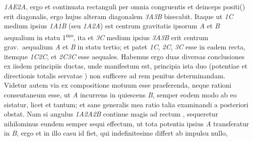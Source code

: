  \textit{{\scriptsize1}AE{\scriptsize2}A}, ergo et continuata rectanguli  
%
%
 per omnia congruentis et deinceps positi\protect\vphantom() erit diagonalis, ergo hujus alteram diagonalem%
\protect{}
%
 \textit{{\scriptsize3}A{\scriptsize3}B} bisecabit. Itaque ut \textit{{\scriptsize1}C} medium ipsius \textit{{\scriptsize1}A{\scriptsize1}B} (seu \textit{{\scriptsize1}A{\scriptsize2}A})
%
 est %
centrum gravitatis\protect{} ipsorum \textit{A} et \textit{B} aequalium in statu 1\textsuperscript{mo},%
\protect{} ita et \textit{{\scriptsize3}C} medium ipsius \textit{{\scriptsize3}A{\scriptsize3}B} erit centrum%
\protect{} grav.\ aequalium \textit{A} et \textit{B} in statu tertio;%
\protect{} et patet \textit{{\scriptsize1}C}, \textit{{\scriptsize2}C}, \textit{{\scriptsize3}C} esse in eadem recta, itemque \textit{{\scriptsize1}C{\scriptsize2}C}, et \textit{{\scriptsize2}C{\scriptsize3}C} esse aequales. 
\pend
\pstart
 Habemus ergo duas diversas conclusiones ex iisdem principiis ductas, unde manifestum est, principia ista duo (potentiae%
\protect{} et directionis totalis servatae%
\protect{}) non sufficere ad rem penitus determinandam. 
\pend
\pstart
 Videtur autem via ex compositione motuum\protect{} esse praeferenda, neque rationi%
\protect{} consentaneum esse, ut \textit{A} incurrens in quiescens \textit{B}, semper eodem modo ab eo sistatur, licet  
%
 et tantum; et sane generalis mea ratio talia examinandi a posteriori obstat. Nam si angulus \textit{{\scriptsize1}A{\scriptsize2}A{\scriptsize2}B} continue magis ad rectum  
%
, sequeretur nihilominus eundem semper sequi effectum,%
\protect{} ut tota potentia\protect{} ipsius \textit{A} transferatur in \textit{B}, ergo et in illo casu id fiet, qui indefinitesime differt ab impulsu nullo,%
